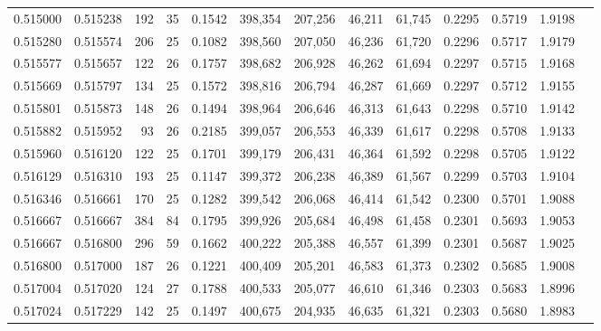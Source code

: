 \begin{tabular}{rrrrrrrrrrrrr}
0.515000 & 0.515238 &    192 &    35 &                                     0.1542 & 398,354 & 207,256 &  46,211 &  61,745 & 0.2295 & 0.5719 & 1.9198 \\
0.515280 & 0.515574 &    206 &    25 &                                     0.1082 & 398,560 & 207,050 &  46,236 &  61,720 & 0.2296 & 0.5717 & 1.9179 \\
0.515577 & 0.515657 &    122 &    26 &                                     0.1757 & 398,682 & 206,928 &  46,262 &  61,694 & 0.2297 & 0.5715 & 1.9168 \\
0.515669 & 0.515797 &    134 &    25 &                                     0.1572 & 398,816 & 206,794 &  46,287 &  61,669 & 0.2297 & 0.5712 & 1.9155 \\
0.515801 & 0.515873 &    148 &    26 &                                     0.1494 & 398,964 & 206,646 &  46,313 &  61,643 & 0.2298 & 0.5710 & 1.9142 \\
0.515882 & 0.515952 &     93 &    26 &                                     0.2185 & 399,057 & 206,553 &  46,339 &  61,617 & 0.2298 & 0.5708 & 1.9133 \\
0.515960 & 0.516120 &    122 &    25 &                                     0.1701 & 399,179 & 206,431 &  46,364 &  61,592 & 0.2298 & 0.5705 & 1.9122 \\
0.516129 & 0.516310 &    193 &    25 &                                     0.1147 & 399,372 & 206,238 &  46,389 &  61,567 & 0.2299 & 0.5703 & 1.9104 \\
0.516346 & 0.516661 &    170 &    25 &                                     0.1282 & 399,542 & 206,068 &  46,414 &  61,542 & 0.2300 & 0.5701 & 1.9088 \\
0.516667 & 0.516667 &    384 &    84 &                                     0.1795 & 399,926 & 205,684 &  46,498 &  61,458 & 0.2301 & 0.5693 & 1.9053 \\
0.516667 & 0.516800 &    296 &    59 &                                     0.1662 & 400,222 & 205,388 &  46,557 &  61,399 & 0.2301 & 0.5687 & 1.9025 \\
0.516800 & 0.517000 &    187 &    26 &                                     0.1221 & 400,409 & 205,201 &  46,583 &  61,373 & 0.2302 & 0.5685 & 1.9008 \\
0.517004 & 0.517020 &    124 &    27 &                                     0.1788 & 400,533 & 205,077 &  46,610 &  61,346 & 0.2303 & 0.5683 & 1.8996 \\
0.517024 & 0.517229 &    142 &    25 &                                     0.1497 & 400,675 & 204,935 &  46,635 &  61,321 & 0.2303 & 0.5680 & 1.8983 \\

\end{tabular}
